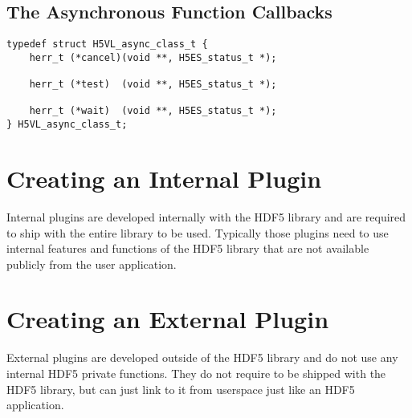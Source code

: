\documentclass[10pt,a4paper]{article}
\begin{document}
\subsection{The Asynchronous Function Callbacks}

\begin{lstlisting}
typedef struct H5VL_async_class_t {
    herr_t (*cancel)(void **, H5ES_status_t *);

    herr_t (*test)  (void **, H5ES_status_t *);

    herr_t (*wait)  (void **, H5ES_status_t *);
} H5VL_async_class_t;
\end{lstlisting}

\section{Creating an Internal Plugin}
Internal plugins are developed internally with the HDF5 library and
are required to ship with the entire library to be used. Typically
those plugins need to use internal features and functions of the HDF5
library that are not available publicly from the user application.

\section{Creating an External Plugin}
External plugins are developed outside of the HDF5 library and do not
use any internal HDF5 private functions. They do not require to be
shipped with the HDF5 library, but can just link to it from userspace
just like an HDF5 application.
\end{document}
